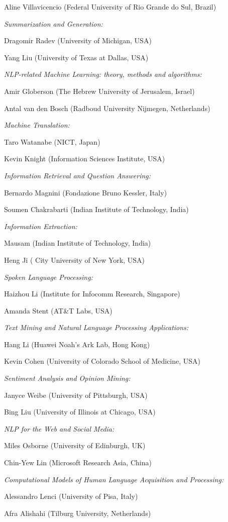 {Aline Villavicencio (Federal University of Rio Grande do Sul, Brazil)

\noindent
\textit{Summarization and Generation:}

Dragomir Radev (University of Michigan, USA)

Yang Liu (University of Texas at Dallas, USA)

\noindent
\textit{NLP-related Machine Learning: theory, methods and algorithms:}

Amir Globerson (The Hebrew University of Jerusalem, Israel)

Antal van den Bosch (Radboud University Nijmegen, Netherlands)

\noindent
\textit{Machine Translation:}

Taro Watanabe (NICT, Japan)

Kevin Knight (Information Sciences Institute, USA)

\noindent
\textit{Information Retrieval and Question Answering:}

Bernardo Magnini (Fondazione Bruno Kessler, Italy)

Soumen Chakrabarti (Indian Institute of Technology, India)

\noindent
\textit{Information Extraction:}

Mausam (Indian Institute of Technology, India)

Heng Ji ( City University of New York, USA)

\noindent
\textit{Spoken Language Processing:}

Haizhou Li (Institute for Infocomm Research, Singapore)

Amanda Stent (AT\&T Labs, USA)

\noindent
\textit{Text Mining and Natural Language Processing Applications:}

Hang Li (Huawei Noah's Ark Lab, Hong Kong)

Kevin Cohen (University of Colorado School of Medicine, USA)

\noindent
\textit{Sentiment Analysis and Opinion Mining:}

Janyce Weibe (University of Pittsburgh, USA)

Bing Liu (University of Illinois at Chicago, USA)

\noindent
\textit{NLP for the Web and Social Media:}

Miles Osborne (University of Edinburgh, UK)

Chin-Yew Lin (Microsoft Research Asia, China)

\noindent
\textit{Computational Models of Human Language Acquisition and Processing:}

Alessandro Lenci (University of Pisa, Italy)

Afra Alishahi (Tilburg University, Netherlands)
}

